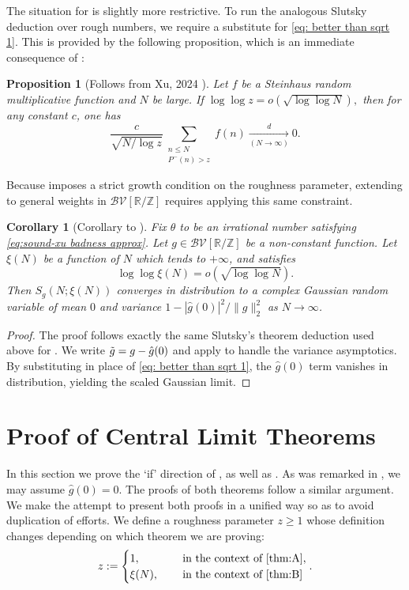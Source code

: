 \documentclass[12pt]{amsart}
\renewcommand{\leq}{\leqslant}
\renewcommand{\geq}{\geqslant}
\numberwithin{equation}{section}
\theoremstyle{plain}
\newtheorem{cor}[thm]{Corollary}
\newtheorem{prop}[thm]{Proposition}
\theoremstyle{definition}
\newcommand{\Z}{\mathbb{Z}}
\newcommand{\R}{\mathbb{R}}
\newcommand{\CB}{\mathcal{B}}
\newcommand{\CV}{\mathcal{V}}
\begin{document}
	The situation for  is slightly more restrictive. To run the analogous Slutsky deduction over rough numbers, we require a substitute for \eqref{eq: better than sqrt 1}. This is provided by the following proposition, which is an immediate consequence of \cite[Theorem 1.2]{xu2024better}:
	
	\begin{prop}[{Follows from Xu, 2024 \cite[Theorem 1.2]{xu2024better}}]\label{prop better sqrt rough}
		Let $f$ be a Steinhaus random multiplicative function and $N$ be large. If $\log \log z = o(\sqrt{\log \log N}),$ then for any constant $c$, one has
		$$\frac{c}{\sqrt{N/\log z}}\sum_{\substack{n \leq N \\ P^-(n) > z}}f(n) \xrightarrow[(N \to \infty)]{d} 0.$$
	\end{prop}
	
	Because  imposes a strict growth condition on the roughness parameter, extending  to general weights in $\CB\CV[\R/\Z]$ requires applying this same constraint. 
	
	\begin{cor}[Corollary to ]\label{cor:B}
		Fix $\theta$ to be an irrational number satisfying \eqref{eq:sound-xu badness approx}. Let $g \in \CB\CV[\R/\Z]$ be a non-constant function. Let $\xi(N)$ be a function of $N$ which tends to $+\infty$, and satisfies $$\log \log \xi(N) = o(\sqrt{ \log \log N}).$$ Then $S_{g}(N;\xi(N))$ converges in distribution to a complex Gaussian random variable of mean $0$ and variance $1-|\hat{g}(0)|^2/\|g\|_2^2$ as $N \to \infty$. 
	\end{cor}
	\begin{proof}
		The proof follows exactly the same Slutsky's theorem deduction used above for . We write $\Tilde{g} = g - \hat{g}(0)$ and apply  to handle the variance asymptotics. By substituting  in place of \eqref{eq: better than sqrt 1}, the $\hat{g}(0)$ term vanishes in distribution, yielding the scaled Gaussian limit. 
	\end{proof}
	
	
	\section{Proof of Central Limit Theorems}\label{sec:proof if}
	In this section we prove the `if' direction of , as well as . As was remarked in , we may assume $\hat{g}(0) = 0$. The proofs of both theorems follow a similar argument. We make the attempt to present both proofs in a unified way so as to avoid duplication of efforts. We define a roughness parameter $z \geq 1$ whose definition changes depending on which theorem we are proving:
	\begin{equation}\label{eq: def z}
		z := \begin{cases}
			1, \quad & \text{ in the context of \Cref{thm:A}},\\
			\xi(N), \quad & \text{ in the context of \Cref{thm:B}}
		\end{cases}.
	\end{equation}
	
\end{document}
